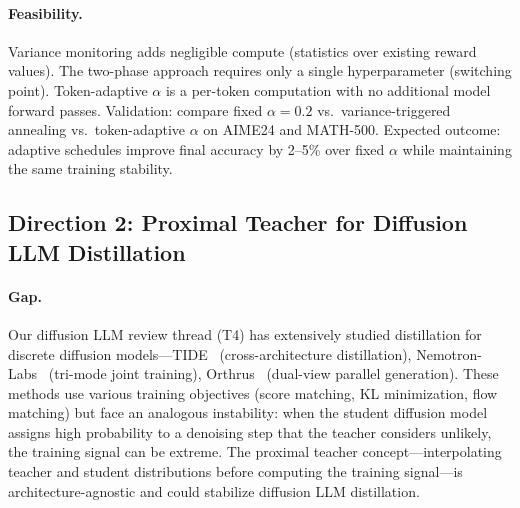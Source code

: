 \documentclass[11pt,a4paper]{article}
\begin{document}
\paragraph{Feasibility.} Variance monitoring adds negligible compute (statistics over existing reward values). The two-phase approach requires only a single hyperparameter (switching point). Token-adaptive $\alpha$ is a per-token computation with no additional model forward passes. Validation: compare fixed $\alpha = 0.2$ vs.\ variance-triggered annealing vs.\ token-adaptive $\alpha$ on AIME24 and MATH-500. Expected outcome: adaptive schedules improve final accuracy by 2--5\% over fixed $\alpha$ while maintaining the same training stability.

\subsection{Direction 2: Proximal Teacher for Diffusion LLM Distillation}

\paragraph{Gap.} Our diffusion LLM review thread (T4) has extensively studied distillation for discrete diffusion models---TIDE~\cite{tide2026} (cross-architecture distillation), Nemotron-Labs~\cite{nemotron2026} (tri-mode joint training), Orthrus~\cite{orthrus2026} (dual-view parallel generation). These methods use various training objectives (score matching, KL minimization, flow matching) but face an analogous instability: when the student diffusion model assigns high probability to a denoising step that the teacher considers unlikely, the training signal can be extreme. The proximal teacher concept---interpolating teacher and student distributions before computing the training signal---is architecture-agnostic and could stabilize diffusion LLM distillation.
\end{document}
